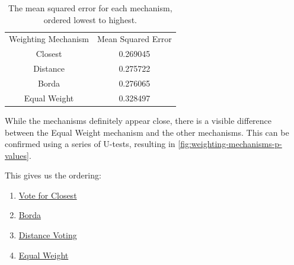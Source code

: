 \begin{table}[htbp]
    \renewcommand{\arraystretch}{1.0}

    \caption{The mean squared error for each mechanism, ordered lowest to highest.}
    \label{tab:weighting-mechanism-mean-error}

    \centering
    \begin{tabular}{|c|c|}
        \hline
        Weighting Mechanism & Mean Squared Error \\
        \hhline{|=|=|}
        Closest             & 0.269045           \\
        \hline
        Distance            & 0.275722           \\
        \hline
        Borda               & 0.276065           \\
        \hline
        Equal Weight        & 0.328497           \\
        \hline
    \end{tabular}
\end{table}

While the mechanisms definitely appear close, there is a visible difference between
the Equal Weight mechanism and the other mechanisms.
This can be confirmed using a series of U-tests, resulting in
\autoref{fig:weighting-mechanisms-p-values}.
\begin{samepage}
    This gives us the ordering:
    \begin{enumerate}
        \item \hyperref[para:closest]{Vote for Closest}
        \item \hyperref[para:borda]{Borda}
        \item \hyperref[para:distance-voting]{Distance Voting}
        \item \hyperref[para:equal-weight]{Equal Weight}
    \end{enumerate}
\end{samepage}

